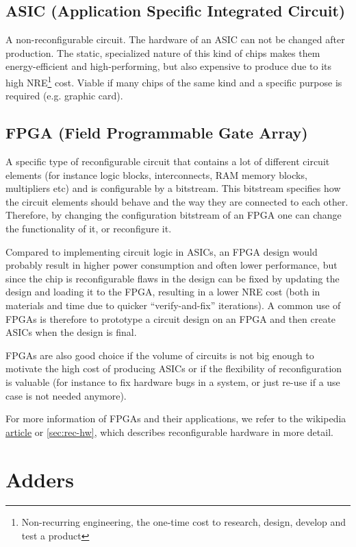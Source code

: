 \documentclass[a4paper,11pt]{report}
\begin{document}
\subsection{ASIC (Application Specific Integrated Circuit)}
A non-reconfigurable circuit. The hardware of an ASIC can not be
changed after production. The static, specialized nature of this kind
of chips makes them energy-efficient and high-performing, but also
expensive to produce due to its high NRE\footnote{Non-recurring
  engineering, the one-time cost to research, design, develop and test
  a product} cost. Viable if many chips of the same kind and a
specific purpose is required (e.g. graphic card).

\subsection{FPGA (Field Programmable Gate Array)}
A specific type of reconfigurable circuit that contains a lot of
different circuit elements (for instance logic blocks, interconnects,
RAM memory blocks, multipliers etc) and is configurable by a
bitstream. This bitstream specifies how the circuit elements should
behave and the way they are connected to each other. Therefore, by
changing the configuration bitstream of an FPGA one can change the
functionality of it, or reconfigure it.

Compared to implementing circuit logic in ASICs, an FPGA design would
probably result in higher power consumption and often lower
performance, but since the chip is reconfigurable flaws in the design
can be fixed by updating the design and loading it to the FPGA,
resulting in a lower NRE cost (both in materials and time due to
quicker ``verify-and-fix'' iterations). A common use of FPGAs is
therefore to prototype a circuit design on an FPGA and then create
ASICs when the design is final.

FPGAs are also good choice if the volume of circuits is not big enough
to motivate the high cost of producing ASICs or if the flexibility of
reconfiguration is valuable (for instance to fix hardware bugs in a
system, or just re-use if a use case is not needed anymore).

For more information of FPGAs and their applications, we refer to the
wikipedia
\href{https://en.wikipedia.org/wiki/Field-programmable_gate_array#Applications}{article}
or \autoref{sec:rec-hw}, which describes reconfigurable hardware in more detail.

\newpage
\section{Adders}
\end{document}
